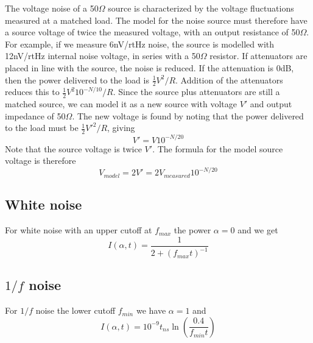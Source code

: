 \documentclass[twocolumn]{article}
\begin{document}
The voltage noise of a 50$\Omega$ source is characterized by the voltage fluctuations measured at a matched load. The model for the noise source must therefore have a source voltage of twice the measured voltage, with an output resistance of 50$\Omega$. For example, if we measure 6nV/rtHz noise, the source is modelled with 12nV/rtHz internal noise voltage, in series with a 50$\Omega$ resistor. If attenuators are placed in line with the source, the noise is reduced. If the attenuation is 0dB, then the power delivered to the load is $\frac{1}{2}V^2/R$. Addition of the attenuators reduces this to $\frac{1}{2}V^2 10^{-N/10}/R$. Since the source plus attenuators are still a matched source, we can model it as a new source with voltage $V'$ and output impedance of 50$\Omega$. The new voltage is found by noting that the power delivered to the load must be $\frac{1}{2}V'^2/R$, giving \begin{equation}
V' = V 10^{-N/20} \end{equation}
Note that the source voltage is twice $V'$. The formula for the model source voltage is therefore \begin{equation}
V_{model} = 2V' = 2 V_{measured} 10^{-N/20} \label{eq:50OhmSourceVoltage} \end{equation}


\subsection{White noise}

For white noise with an upper cutoff at $f_{max}$ the power $\alpha=0$ and we get \begin{equation}
I(\alpha, t) = \frac{1}{2+(f_{max}t)^{-1}} \end{equation}


\subsection{$1/f$ noise}

For $1/f$ noise the lower cutoff $f_{min}$ we have $\alpha=1$ and \begin{equation}
I(\alpha, t) = 10^{-9} t_{ns} \ln \left( \frac{0.4}{f_{min}t}\right) \end{equation}
\end{document}
